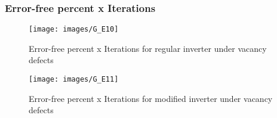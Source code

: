 \subsubsection{Error-free percent x Iterations}

\begin{figure}[h!]
\center
\texttt{[image: images/G\_E10]}
\caption{Error-free percent x Iterations for regular inverter under vacancy defects}
\label{figure:inverter_reg_gt5}
\end{figure}

\begin{figure}[h!]
\center
\texttt{[image: images/G\_E11]}
\caption{Error-free percent x Iterations for modified inverter under vacancy defects}
\label{figure:inverter_mod_gt5}
\end{figure}
\pagebreak